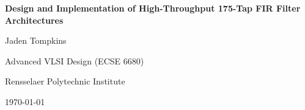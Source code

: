 \documentclass[12pt]{article}
\begin{document}
\begin{titlepage}
    \centering
    \vspace*{2cm}
    {\huge \textbf{Design and Implementation of High-Throughput 175-Tap FIR Filter Architectures} \par}
    \vspace{1.5cm}
    {\Large Jaden Tompkins \par}
    \vspace{0.5cm}
    {\large Advanced VLSI Design (ECSE 6680) \par}
    {\large Rensselaer Polytechnic Institute \par}
    \vfill
    {\large \today \par}
\end{titlepage}

\newpage

\begin{abstract}
This report presents a comprehensive design space exploration of 175-tap FIR filter architectures. By analyzing performance metrics such as area (ALMs), power, and $F_{max}$ for seven distinct designs, we demonstrate the throughput advantages of parallel and pipelined structures.
\end{abstract}
\end{document}
